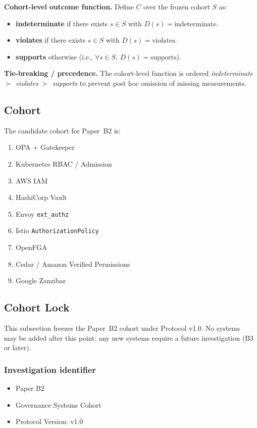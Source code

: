 \textbf{Cohort-level outcome function.} Define $C$ over the frozen cohort $S$ as:
\begin{itemize}
  \item \textbf{indeterminate} if there exists $s\in S$ with $D(s)=\text{indeterminate}$.
  \item \textbf{violates} if there exists $s\in S$ with $D(s)=\text{violates}$.
  \item \textbf{supports} otherwise (i.e., $\forall s\in S,\ D(s)=\text{supports}$).
\end{itemize}

\textbf{Tie-breaking / precedence.} The cohort-level function is ordered \emph{indeterminate $\succ$ violates $\succ$ supports} to prevent post hoc omission of missing measurements.

\subsection{Cohort}
The candidate cohort for Paper~B2 is:
\begin{enumerate}
  \item OPA + Gatekeeper
  \item Kubernetes RBAC / Admission
  \item AWS IAM
  \item HashiCorp Vault
  \item Envoy \texttt{ext\_authz}
  \item Istio \texttt{AuthorizationPolicy}
  \item OpenFGA
  \item Cedar / Amazon Verified Permissions
  \item Google Zanzibar
\end{enumerate}

\subsection{Cohort Lock}
\label{sec:cohort-lock}
This subsection freezes the Paper~B2 cohort under Protocol v1.0. No systems may be added after this point; any new systems require a future investigation (B3 or later).

\subsubsection{Investigation identifier}
\begin{itemize}
  \item Paper B2
  \item Governance Systems Cohort
  \item Protocol Version: v1.0
\end{itemize}

